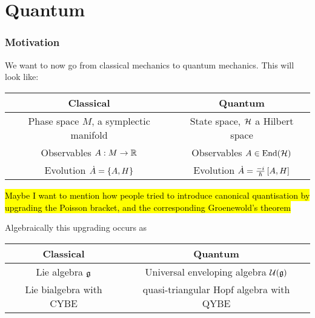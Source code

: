 \documentclass{article}
\begin{document}
\part{Quantum}
\section{Motivation}
We want to now go from classical mechanics to quantum mechanics. This will look like:

\begin{center}
    \begin{tabular}{c|c}
    Classical & Quantum \\ \hline \hline
    Phase space $M$, a symplectic manifold & State space,  $\mc{H}$ a Hilbert space \\
    \hline 
    Observables $A:M \to \mbb{R}$ & Observables $A \in \End(\mc{H})$ \\ \hline
    Evolution $\dot{A} = \acomm[A]{H}$ & Evolution $\dot{A} = \frac{-i}{\hbar}\comm[A]{H}$
    \end{tabular}
\end{center}

\begin{remark}
\hl{Maybe I want to mention how people tried to introduce canonical quantisation by upgrading the Poisson bracket, and the corresponding Groenewold's theorem}
\end{remark}


        

Algebraically this upgrading occurs as 

\begin{center}
    \begin{tabular}{c|c}
    Classical & Quantum \\ \hline \hline
    Lie algebra $\mf{g}$ & Universal enveloping algebra $\mc{U}(\mf{g})$ \\ \hline 
    Lie bialgebra with CYBE & quasi-triangular Hopf algebra with QYBE
    \end{tabular}
\end{center}
\end{document}
